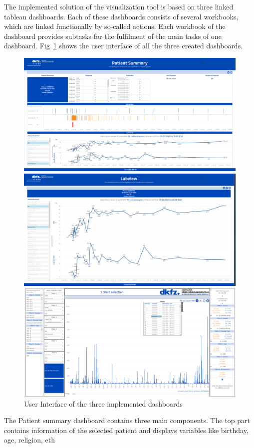 The implemented solution of the visualization tool is based on three linked tableau dashboards. Each of these dashboards consists of several workbooks, which are linked functionally by so-called actions. Each workbook of the dashboard provides subtasks for the fulfilment of the main tasks of one dashboard. Fig~\ref{fig:overviewdashboard} shows the user interface of all the three created dashboards.

\begin{figure}[ht]
   \begin{minipage}[b]{.5\linewidth}          \includegraphics[width=1.05\textwidth]{images/Pat sum.png}
   \end{minipage}%
   \hfill
   \begin{minipage}[b]{.5\linewidth} 
 \includegraphics[width=1.05\textwidth]{images/Labview.png} 
   \end{minipage}%
   \vfill
      \begin{minipage}[b]{\linewidth}          \includegraphics[width=1.05\textwidth]{images/ch sel.png}
   \end{minipage}%
   \caption{User Interface of the three implemented dashboards}\label{fig:overviewdashboard} 
\end{figure} 

The Patient summary dashboard contains three main components. The top part contains information of the selected patient and displays variables like birthday, age, religion, eth